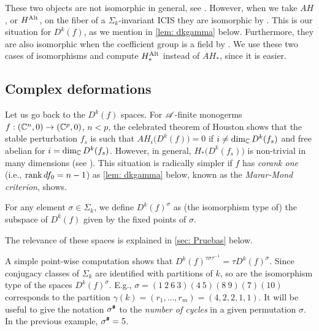 \documentclass[a4paper,12pt]{amsart}
\begin{document}
\begin{remark}\label{rem:HaltToAH}
These two objects are not isomorphic in general, see \cite[Example 5.1]{Houston1999}. However, when we take $AH$, or $H^{\textnormal{Alt}}$, on the fiber of a $\Sigma_k$-invariant ICIS they are isomorphic by \cite[Theorem 2.1.2]{Goryunov1995}. This is our situation for $D^k(f)$, as we mention in \cref{lem: dkgamma} below. Furthermore, they are also isomorphic when the coefficient group is a field by \cite[Proposition 10.1]{Mond2020}. We use these two cases of isomorphisms and compute $H^{\textnormal{Alt}}_*$ instead of $AH_*$, since it is easier.
\end{remark}

\subsection{Complex deformations}\label{sec:complexdef}

Let us go back to the $D^k(f)$ spaces. For $\mathscr{A}$-finite monogerms $f:(\mathbb{C}^n,0)\to(\mathbb{C}^p,0)$, $n<p$, the celebrated theorem of Houston \cite[Theorem 4.6]{Houston1997} shows that the stable perturbation $f_s$ is such that $AH_i\big(D^k(f)\big)=0$ if $i\neq \operatorname{dim}_{\mathbb{C}} D^k(f_s)$ and free abelian for $i = \operatorname{dim}_{\mathbb{C}} D^k(f_s)$. However, in general, $H_*\big(D^k(f_s)\big)$ is non-trivial in many dimensions (see \cite{Mond2016}). This situation is radically simpler if $f$ has \textit{corank one} (i.e., $\operatorname{rank} df_0=n-1$) as \cref{lem: dkgamma} below, known as the \textit{Marar-Mond criterion}, shows.


\begin{definition}\label{def:dksigma}
For any element $\sigma\in\Sigma_k$, we define $D^k(f)^\sigma$ as (the isomorphism type of) the subspace of $D^k(f)$ given by the fixed points of $\sigma$. 
\end{definition}

The relevance of these spaces is explained in \cref{sec: Pruebas} below.

A simple point-wise computation shows that $D^k(f)^{\tau\sigma\tau^{-1}}=\tau D^k(f)^\sigma$. Since conjugacy classes of $\Sigma_k$ are identified with partitions of $k$, so are the isomorphism type of the spaces $D^k(f)^\sigma$. E.g., $\sigma=(1\ 2\ 6\ 3)(4\ 5)(8\ 9)(7)(10)$ corresponds to the partition $\gamma(k)=(r_1,\dots, r_m)=(4,2,2,1,1)$. It will be useful to give the notation $\sigma^{\texttt{\#}}$ to the \textit{number of cycles} in a given permutation $\sigma$. In the previous example, $\sigma^{\texttt{\#}}=5$.
\end{document}
